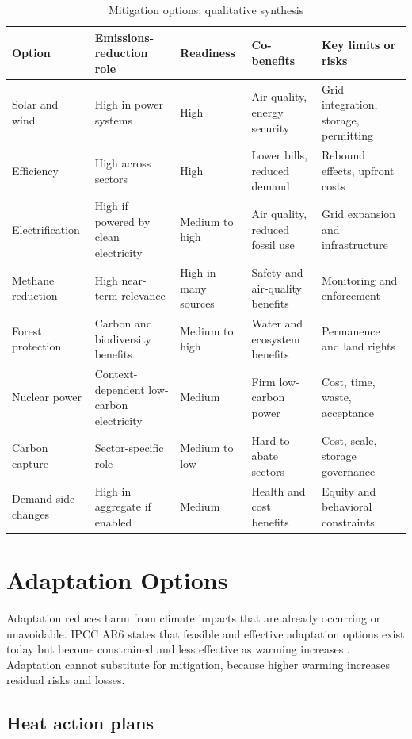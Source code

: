 \documentclass[12pt]{article}
\begin{document}
\begin{table}[htbp]
\centering
\caption{Mitigation options: qualitative synthesis}
\begin{tabularx}{\textwidth}{p{3cm}p{3cm}p{2.6cm}Y Y}
\toprule
Option & Emissions-reduction role & Readiness & Co-benefits & Key limits or risks \\
\midrule
Solar and wind & High in power systems & High & Air quality, energy security & Grid integration, storage, permitting \\
Efficiency & High across sectors & High & Lower bills, reduced demand & Rebound effects, upfront costs \\
Electrification & High if powered by clean electricity & Medium to high & Air quality, reduced fossil use & Grid expansion and infrastructure \\
Methane reduction & High near-term relevance & High in many sources & Safety and air-quality benefits & Monitoring and enforcement \\
Forest protection & Carbon and biodiversity benefits & Medium to high & Water and ecosystem benefits & Permanence and land rights \\
Nuclear power & Context-dependent low-carbon electricity & Medium & Firm low-carbon power & Cost, time, waste, acceptance \\
Carbon capture & Sector-specific role & Medium to low & Hard-to-abate sectors & Cost, scale, storage governance \\
Demand-side changes & High in aggregate if enabled & Medium & Health and cost benefits & Equity and behavioral constraints \\
\bottomrule
\end{tabularx}
\end{table}

\section{Adaptation Options}

Adaptation reduces harm from climate impacts that are already occurring or unavoidable. IPCC AR6 states that feasible and effective adaptation options exist today but become constrained and less effective as warming increases \cite{ref1}. Adaptation cannot substitute for mitigation, because higher warming increases residual risks and losses.

\subsection{Heat action plans}
\end{document}
